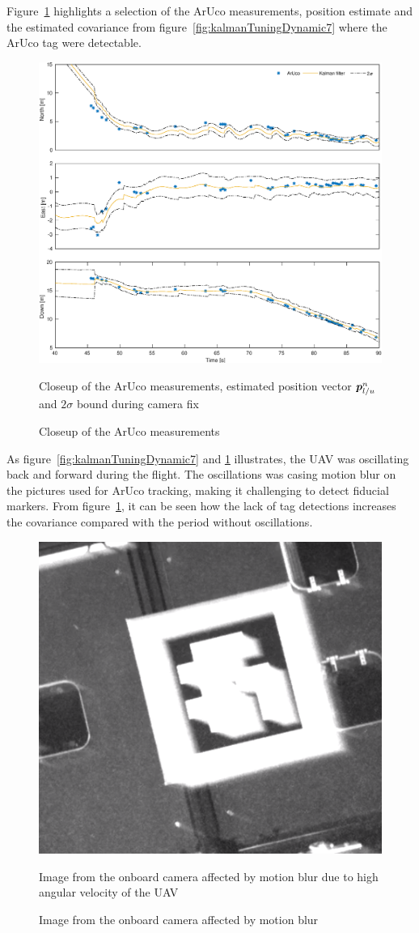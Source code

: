 Figure~\ref{fig:kalmanTuningDynamic7closeup} highlights a selection of the ArUco measurements, position estimate and the estimated covariance from figure~\ref{fig:kalmanTuningDynamic7} where the ArUco tag were detectable.
\begin{figure}
	\centering
	\includegraphics[width=.75\linewidth]{img/plot/dynamic/dynamic_7_closeup.eps}
	\caption{Closeup of the ArUco measurements}{Closeup of the ArUco measurements, estimated position vector $\boldsymbol{p}^{n}_{l/u}$ and $2\sigma$ bound during camera fix}
	\label{fig:kalmanTuningDynamic7closeup}
\end{figure}
As figure~\ref{fig:kalmanTuningDynamic7} and \ref{fig:kalmanTuningDynamic7closeup} illustrates, the UAV was oscillating back and forward during the flight. The oscillations was casing motion blur on the pictures used for ArUco tracking, making it challenging to detect fiducial markers. From figure~\ref{fig:kalmanTuningDynamic7closeup}, it can be seen how the lack of tag detections increases the covariance compared with the period without oscillations. 
\begin{figure}[!ht]
	\centering
    \includegraphics[width=.45\linewidth]{img/image_in_motion.png}
    \caption{Image from the onboard camera affected by motion blur}{Image from the onboard camera affected by motion blur due to high angular velocity of the UAV}
    \label{fig:imageInMotion}
\end{figure}

